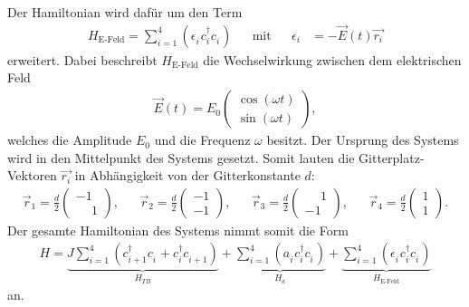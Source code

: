 Der Hamiltonian wird dafür um den Term
\begin{align}
  H_\text{E-Feld}=\sum_{i=1}^4\left(\epsilon_i^{\phantom{\dag}} c_i^\dag c_i^{\phantom{\dag}}\right)& &\text{mit}& &\epsilon_i&=-\vec{E}(t) \vec{r_i}
\end{align}
erweitert.
 Dabei beschreibt $H_\text{E-Feld}$ die Wechselwirkung zwischen dem elektrischen Feld
\begin{align}
  \vec E(t)=E_0\begin{pmatrix}
\cos\left(\omega t\right)\\
\sin\left(\omega t\right)
 \end{pmatrix},
\end{align}
welches die Amplitude $E_0$ und
die Frequenz $\omega$ besitzt.
Der Ursprung des Systems wird
in den Mittelpunkt des Systems gesetzt.
Somit lauten die Gitterplatz-Vektoren
$\vec{r_i}$ in Abhängigkeit von der
Gitterkonstante $d$:
\begin{align}
  \vec{r}_1=\frac{d}{2}\begin{pmatrix}-1  \\ \phantom{-}1 \end{pmatrix},& &
  \vec{r}_2=\frac{d}{2}\begin{pmatrix}-1  \\ -1 \end{pmatrix},& &
  \vec{r}_3=\frac{d}{2}\begin{pmatrix}\phantom{-}1  \\ -1 \end{pmatrix},& &
  \vec{r}_4=\frac{d}{2}\begin{pmatrix}1  \\ 1 \end{pmatrix}.
\end{align}
Der gesamte Hamiltonian des Systems nimmt somit die Form
\begin{align}
H=\underbrace{J\sum_{i=1}^4 \left(c_{i+1}^\dag c_i^{\phantom{\dag}} + c_{i}^\dag c_{i+1}^{\phantom{\dag}}\right)}_{H_{TB}}
+\underbrace{\sum_{i=1}^4 \left(a_i^{\phantom{\dag}} c_i^\dag c_i^{\phantom{\dag}}\right)}_{H_a}
+\underbrace{\sum_{i=1}^4 \left(\epsilon^{\phantom{\dag}}_i c_i^\dag c_i^{\phantom{\dag}}\right)}_{H_\text{E-Feld}}
\end{align}
an.


